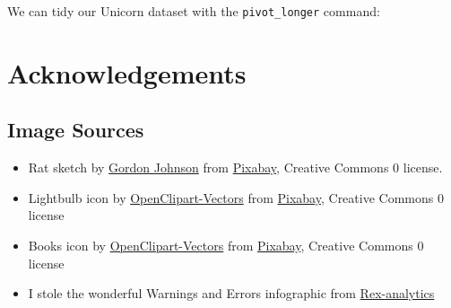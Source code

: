 \documentclass[
]{book}
\newenvironment{Shaded}{\begin{snugshade}}{\end{snugshade}}
\newcommand{\DataTypeTok}[1]{\textcolor[rgb]{0.13,0.29,0.53}{#1}}
\newcommand{\KeywordTok}[1]{\textcolor[rgb]{0.13,0.29,0.53}{\textbf{#1}}}
\newcommand{\NormalTok}[1]{#1}
\newcommand{\OperatorTok}[1]{\textcolor[rgb]{0.81,0.36,0.00}{\textbf{#1}}}
\newcommand{\StringTok}[1]{\textcolor[rgb]{0.31,0.60,0.02}{#1}}
\begin{document}
We can tidy our Unicorn dataset with the \texttt{pivot\_longer} command:

\begin{Shaded}
\end{Shaded}

\hypertarget{acks}{%
\chapter{Acknowledgements}\label{acks}}

\hypertarget{image-sources}{%
\section{Image Sources}\label{image-sources}}

\begin{itemize}
\item
  Rat sketch by \href{https://pixabay.com/users/GDJ-1086657/?utm_source=link-attribution\&utm_medium=referral\&utm_campaign=image\&utm_content=5139264}{Gordon Johnson} from \href{https://pixabay.com/?utm_source=link-attribution\&utm_medium=referral\&utm_campaign=image\&utm_content=5139264}{Pixabay}, Creative Commons 0 license.
\item
  Lightbulb icon by \href{https://pixabay.com/users/OpenClipart-Vectors-30363/?utm_source=link-attribution\&utm_medium=referral\&utm_campaign=image\&utm_content=2027372}{OpenClipart-Vectors} from \href{https://pixabay.com/?utm_source=link-attribution\&utm_medium=referral\&utm_campaign=image\&utm_content=2027372}{Pixabay}, Creative Commons 0 license
\item
  Books icon by \href{https://pixabay.com/users/OpenClipart-Vectors-30363/?utm_source=link-attribution\&utm_medium=referral\&utm_campaign=image\&utm_content=1294379}{OpenClipart-Vectors} from \href{https://pixabay.com/?utm_source=link-attribution\&utm_medium=referral\&utm_campaign=image\&utm_content=1294379}{Pixabay}, Creative Commons 0 license
\item
  I stole the wonderful Warnings and Errors infographic from \href{http://rex-analytics.com/decoding-error-messages-r/}{Rex-analytics}
\end{itemize}
\end{document}
